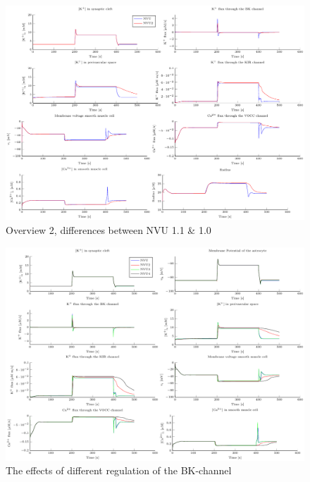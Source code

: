 \begin{landscape}
	\begin{figure}[h!]
		\centering
		\tiny 
		\setlength\figureheight{2.5 cm} 
		\setlength\figurewidth{9 cm}
		\includegraphics{figures/fig6_NVU_12.pdf}
		\caption{Overview 2, differences between NVU 1.1  \& 1.0  }
		\label{fig:NVU10b}
	\end{figure}
		\begin{figure}[h!]
			\centering
			\tiny  
			\setlength\figureheight{2.5 cm} 
			\setlength\figurewidth{9 cm}
			\includegraphics{figures/BK_eff_NVU14.pdf}
			\caption{The effects of different regulation of the BK-channel}
			\label{fig:BKeff}
		\end{figure}
		

\end{landscape}
